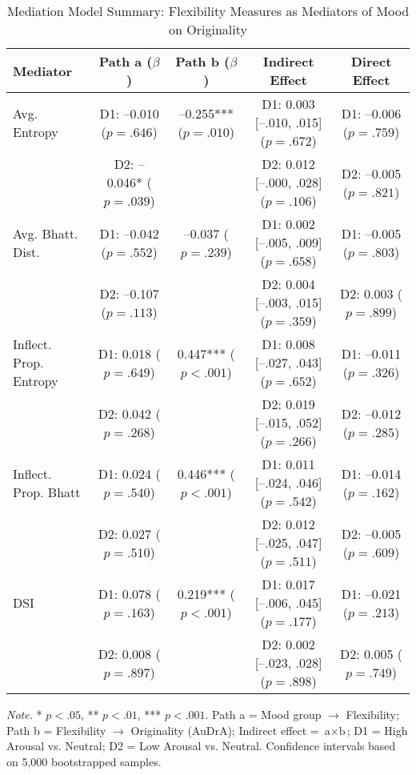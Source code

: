 \documentclass[../MA_Thesis.tex]{subfiles}
\begin{document}
\begin{appendix}
\begin{table}[H]
{\fontsize{9pt}{11pt}\selectfont
\centering
\caption{Mediation Model Summary: Flexibility Measures as Mediators of Mood on Originality}
\label{tab:mediation_summary}
\begin{tabular}{lcccc}
\toprule
\textbf{Mediator} & \textbf{Path a} ($\beta$) & \textbf{Path b} ($\beta$) & \textbf{Indirect Effect} & \textbf{Direct Effect} \\
\midrule
Avg. Entropy & D1: –0.010 ($p = .646$) & –0.255*** ($p = .010$) & D1: 0.003 [–.010, .015] ($p = .672$) & D1: –0.006 ($p = .759$) \\
             & D2: –0.046* ($p = .039$) &                         & D2: 0.012 [–.000, .028] ($p = .106$) & D2: –0.005 ($p = .821$) \\
\addlinespace
Avg. Bhatt. Dist. & D1: –0.042 ($p = .552$) & –0.037 ($p = .239$) & D1: 0.002 [–.005, .009] ($p = .658$) & D1: –0.005 ($p = .803$) \\
                  & D2: –0.107 ($p = .113$) &                     & D2: 0.004 [–.003, .015] ($p = .359$) & D2:  0.003 ($p = .899$) \\
\addlinespace
Inflect. Prop. Entropy & D1:  0.018 ($p = .649$) &  0.447*** ($p < .001$) & D1: 0.008 [–.027, .043] ($p = .652$) & D1: –0.011 ($p = .326$) \\
                       & D2:  0.042 ($p = .268$) &                         & D2: 0.019 [–.015, .052] ($p = .266$) & D2: –0.012 ($p = .285$) \\
\addlinespace
Inflect. Prop. Bhatt & D1:  0.024 ($p = .540$) &  0.446*** ($p < .001$) & D1: 0.011 [–.024, .046] ($p = .542$) & D1: –0.014 ($p = .162$) \\
                     & D2:  0.027 ($p = .510$) &                        & D2: 0.012 [–.025, .047] ($p = .511$) & D2: –0.005 ($p = .609$) \\
\addlinespace
DSI & D1: 0.078 ($p = .163$) & 0.219*** ($p < .001$) & D1: 0.017 [–.006, .045] ($p = .177$) & D1: –0.021 ($p = .213$) \\
    & D2: 0.008 ($p = .897$) &                        & D2: 0.002 [–.023, .028] ($p = .898$) & D2:  0.005 ($p = .749$) \\
\bottomrule
\end{tabular}
\begin{tablenotes}[flushleft]
\small
\item \textit{Note.} * $p < .05$, ** $p < .01$, *** $p < .001$. Path a = Mood group $\rightarrow$ Flexibility; Path b = Flexibility $\rightarrow$ Originality (AuDrA); Indirect effect = $\text{a} \times \text{b}$; D1 = High Arousal vs. Neutral; D2 = Low Arousal vs. Neutral. Confidence intervals based on 5,000 bootstrapped samples.

\end{tablenotes}}
\end{table}
\end{appendix}
\end{document}
